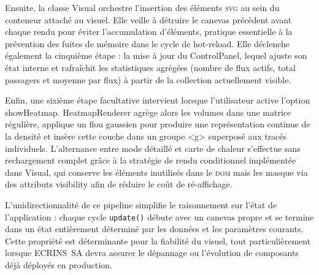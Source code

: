 Ensuite, la classe Visual orchestre l’insertion des éléments \textsc{svg} au sein du conteneur attaché au visuel. Elle veille à détruire le canevas précédent avant chaque rendu pour éviter l’accumulation d’éléments, pratique essentielle à la prévention des fuites de mémoire dans le cycle de hot-reload. Elle déclenche également la cinquième étape : la mise à jour du ControlPanel, lequel ajuste son état interne et rafraîchit les statistiques agrégées (nombre de flux actifs, total passagers et moyenne par flux) à partir de la collection actuellement visible.

Enfin, une sixième étape facultative intervient lorsque l’utilisateur active l’option showHeatmap. HeatmapRenderer agrège alors les volumes dans une matrice régulière, applique un flou gaussien pour produire une représentation continue de la densité et insère cette couche dans un groupe <g> superposé aux tracés individuels. L’alternance entre mode détaillé et carte de chaleur s’effectue sans rechargement complet grâce à la stratégie de rendu conditionnel implémentée dans Visual, qui conserve les éléments inutilisés dans le \textsc{dom} mais les masque via des attributs visibility afin de réduire le coût de ré-affichage.

L’unidirectionnalité de ce pipeline simplifie le raisonnement sur l’état de l’application : chaque cycle \verb|update()| débute avec un canevas propre et se termine dans un état entièrement déterminé par les données et les paramètres courants. Cette propriété est déterminante pour la fiabilité du visuel, tout particulièrement lorsque ECRINS~SA devra assurer le dépannage ou l’évolution de composants déjà déployés en production.
